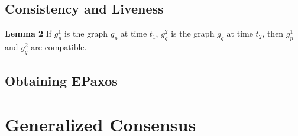\begin{comment}
Define $\opn{Lin}_g\left( \leq \right) = f\left[ V_1 \right] \cdot F\left[ V_2 \right] \cdot F\left[ V_n \right]$, where $V_i\in V\left( \hat{g} \right)$ 


Define the set of linearizations $\opn{Lins}\left( g \right)$ of a graph $g$ as the set of sequences whose length is the cardinality of $V\left( g \right)$, which contain each element of $V\left( g \right)$ exactly once, and ... \todo{or first define the partial order induced by a graph and then its compatible total orders.}

Consider a function $f$ mapping sets of commands to sequences of commands such that $f\left[ cs \right]$ contains each command in $cs$ exactly once.
A sequence of commands $cseq$ is an $f$-linearization of the graph $g$ if and only there is a sequence whose element of strongly connected 

\todo{Explain the graph processing algo independently? Its key property is that when $G1 \subseteq G2$ then $lin\left( c_1,G1 \right)$ is a prefix of $lin\left( c_2,G2 \right)$ or vice-versa.}

\end{comment}

\subsection{Consistency and Liveness}

\textbf{Lemma 2}
If $g_p^1$ is the graph $g_p$ at time $t_1$, $g_q^2$ is the graph $g_q$ at time $t_2$, then $g_p^1$ and $g_q^2$ are compatible.

\begin{comment}
\textbf{Lemma 3}
Consider $g_1$ and $g_2$. Assume that if $v\in V\left( g_1 \right)$ and $v\in V\left( g_2 \right)$ then $n\left( g_1 \right)=n\left( g2 \right)$.

\textbf{Lemma 4}
If $m_p\subseteq m_q$

\end{comment}

\subsection{Obtaining EPaxos}

\printbibliography%

\appendix

\section{Generalized Consensus}

